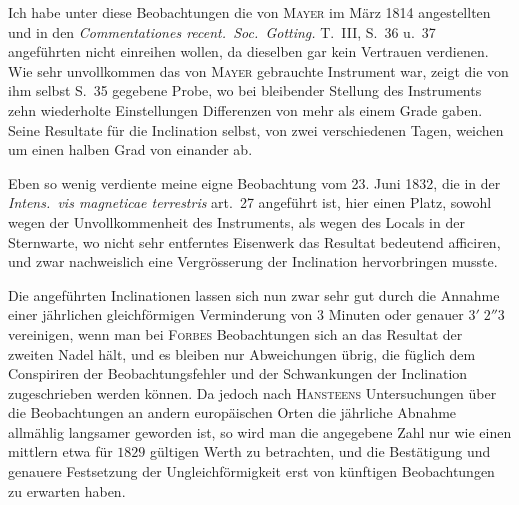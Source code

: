 Ich habe unter diese Beobachtungen die von \textsc{Mayer} im März 1814 angestellten und in den \textit{Commentationes recent.\ Soc.\ Gotting.} T.\ III, S.\ 36 u.\ 37 angeführten nicht einreihen wollen, da dieselben gar kein Vertrauen verdienen. Wie sehr unvollkommen das von \textsc{Mayer} gebrauchte Instrument war, zeigt die von ihm selbst S.\ 35 gegebene Probe, wo bei bleibender Stellung des Instruments zehn wiederholte Einstellungen Differenzen von mehr als einem Grade gaben. Seine Resultate für die Inclination selbst, von zwei verschiedenen Tagen, weichen um einen halben Grad von einander ab.

Eben so wenig verdiente meine eigne Beobachtung vom 23. Juni 1832, die in der \textit{Intens.\ vis magneticae terrestris} art.\ 27 angeführt ist, hier einen Platz, sowohl wegen der Unvollkommenheit des Instruments, als wegen des Locals in der Sternwarte, wo nicht sehr entferntes Eisenwerk das Resultat bedeutend afficiren, und zwar nachweislich eine Vergrösserung der Inclination hervorbringen musste.

Die angeführten Inclinationen lassen sich nun zwar sehr gut durch die Annahme einer jährlichen gleichförmigen Verminderung von $3$ Minuten oder genauer $3'\;2''3$ vereinigen, wenn man bei \textsc{Forbes} Beobachtungen sich an das Resultat der zweiten Nadel hält, und es bleiben nur Abweichungen übrig, die füglich dem Conspiriren der Beobachtungsfehler und der Schwankungen der Inclination zugeschrieben werden können. Da jedoch nach \textsc{Hansteens} Untersuchungen über die Beobachtungen an andern europäischen Orten die jährliche Abnahme allmählig langsamer geworden ist, so wird man die angegebene Zahl nur wie einen mittlern etwa für $1829$ gültigen Werth zu betrachten, und die Bestätigung und genauere Festsetzung der Ungleichförmigkeit erst von künftigen Beobachtungen zu erwarten haben.

